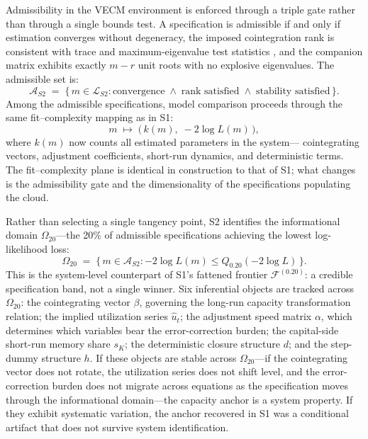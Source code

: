 \documentclass[11pt,a4paper]{article}
\begin{document}

Admissibility in the VECM environment is enforced through a triple gate
rather than through a single bounds test. A specification is admissible if
and only if estimation converges without degeneracy, the imposed cointegration
rank is consistent with trace and maximum-eigenvalue test statistics
\citep{Johansen1991}, and the companion matrix exhibits exactly $m - r$ unit
roots with no explosive eigenvalues. The admissible set is:
%
\begin{equation}
	\label{eq:S2_admissible}
	\mathcal{A}_{S2} \;=\;
	\bigl\{\, m \in \mathcal{L}_{S2} :
	\text{convergence} \;\wedge\;
	\text{rank satisfied} \;\wedge\;
	\text{stability satisfied}
	\,\bigr\}.
\end{equation}
%
Among the admissible specifications, model comparison proceeds through the
same fit--complexity mapping as in S1:
%
\begin{equation}
	\label{eq:S2_fitcomplexity}
	m \;\mapsto\; \bigl(\,k(m),\; -2\log L(m)\,\bigr),
\end{equation}
%
where $k(m)$ now counts all estimated parameters in the system---
cointegrating vectors, adjustment coefficients, short-run dynamics, and
deterministic terms. The fit--complexity plane is identical in construction to
that of S1; what changes is the admissibility gate and the dimensionality of
the specifications populating the cloud.


Rather than selecting a single tangency point, S2 identifies the
informational domain $\Omega_{20}$---the 20\% of admissible specifications
achieving the lowest log-likelihood loss:
%
\begin{equation}
	\label{eq:S2_omega20}
	\Omega_{20} \;=\;
	\bigl\{\, m \in \mathcal{A}_{S2} :
	{-2\log L}(m) \leq Q_{0.20}({-2\log L})
	\,\bigr\}.
\end{equation}
%
This is the system-level counterpart of S1's fattened frontier
$\mathcal{F}^{(0.20)}$: a credible specification band, not a single winner.
Six inferential objects are tracked across $\Omega_{20}$: the cointegrating
vector $\beta$, governing the long-run capacity transformation relation; the
implied utilization series $\widehat{u}_t$; the adjustment speed matrix
$\alpha$, which determines which variables bear the error-correction burden;
the capital-side short-run memory share $s_K$; the deterministic closure
structure $d$; and the step-dummy structure $h$. If these objects
are stable across $\Omega_{20}$---if the cointegrating vector does not
rotate, the utilization series does not shift level, and the
error-correction burden does not migrate across equations as the
specification moves through the informational domain---the capacity anchor
is a system property. If they exhibit systematic variation, the anchor
recovered in S1 was a conditional artifact that does not survive system
identification.
\end{document}
